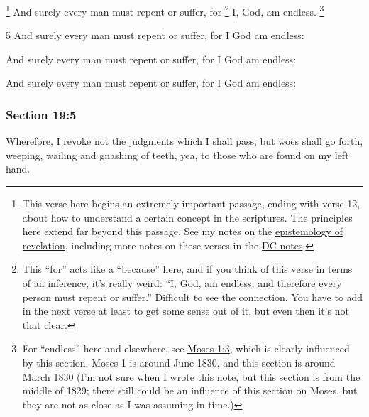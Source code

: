 			\footnote{%
				This verse here begins an extremely important passage, ending with verse 12, about how to understand a certain concept in the scriptures. The principles here extend far beyond this passage. See my notes on the \hyperref[EPIST-REVELATION]{epistemology of revelation}, including more notes on these verses in the \hyperref[EPIST-REVELATION-DC]{DC notes}.
				}%
		And surely every man must repent or suffer, for%
			\footnote{%
				This ``for'' acts like a ``because'' here, and if you think of this verse in terms of an inference, it's really weird: ``I, God, am endless, and therefore every person must repent or suffer.'' Difficult to see the connection. You have to add in the next verse at least to get some sense out of it, but even then it's not that clear.
				}
		I, God, am endless.%
			\footnote{%
				\label{DC19-4-NOTE-endless}%
				For ``endless'' here and elsewhere, see \hyperref[MOSES-1-3]{Moses 1:3}, which is clearly influenced by this section. Moses 1 is around June 1830, and this section is around March 1830 (I'm not sure when I wrote this note, but this section is from the middle of 1829; there still could be an influence of this section on Moses, but they are not as close as I was assuming in time.)
				}

		\begin{framed}
		\scriptsize
			\begin{compactdesc}
				\item[JSP] 5 And surely every man must repent or suffer, for I God am endless:
				\item[RB1] [\textit{missing}]
				\item[DC 1835] And surely every man must repent or suffer, for I God am endless: 
				\item[DC 1844] And surely every man must repent or suffer, for I God am endless: 
			\end{compactdesc}
		\end{framed}

	\subsubsection{Section 19:5} %
		\label{DC19-5}

		\hyperref[WHEREFORE]{Wherefore}, I revoke not the judgments which I shall pass, but woes shall go forth, weeping, wailing and gnashing of teeth, yea, to those who are found on my left hand.

